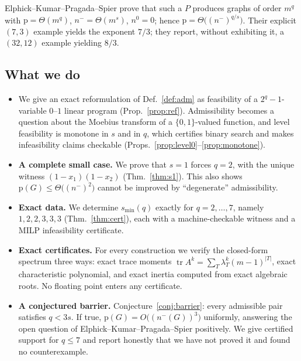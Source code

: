 \documentclass[11pt,a4paper]{article}
\theoremstyle{plain}
\theoremstyle{definition}
\newcommand{\pp}{\mathrm{p}}
\begin{document}
Elphick--Kumar--Pragada--Spier prove that such a $P$ produces graphs of order $m^q$ with
$\pp=\Theta(m^q)$, $n^-=\Theta(m^s)$, $n^0=0$; hence $\pp=\Theta\big((n^-)^{q/s}\big)$.
Their explicit $(7,3)$ example yields the exponent $7/3$; they report, without exhibiting
it, a $(32,12)$ example yielding $8/3$.

\subsection*{What we do}

\begin{itemize}
\item[\textbf{(A)}] We give an exact reformulation of \textup{Def.~\ref{def:adm}} as
      feasibility of a $2^q-1$-variable $0$--$1$ linear program
      (Prop.~\ref{prop:ref}).  Admissibility becomes a question about the Moebius
      transform of a $\{0,1\}$-valued function, and level feasibility is monotone in $s$
      and in $q$, which certifies binary search and makes infeasibility claims checkable
      (Props.~\ref{prop:level0}--\ref{prop:monotone}).
\item[\textbf{(B)}] \textbf{A complete small case.}  We prove that $s=1$ forces $q=2$,
      with the unique witness $(1-x_1)(1-x_2)$
      (Thm.~\ref{thm:s1}).  This also shows $\pp(G)\le \Theta\big((n^-)^{2}\big)$ cannot be
      improved by ``degenerate'' admissibility.
\item[\textbf{(C)}] \textbf{Exact data.}  We determine $s_{\min}(q)$ exactly for
      $q=2,\dots,7$, namely $1,2,2,3,3,3$ (Thm.~\ref{thm:cert}), each with a
      machine-checkable witness and a MILP infeasibility certificate.
\item[\textbf{(D)}] \textbf{Exact certificates.}  For every construction we verify the
      closed-form spectrum three ways: exact trace moments
      $\operatorname{tr}A^k=\sum_T\lambda_T^k(m-1)^{|T|}$, exact characteristic
      polynomial, and exact inertia computed from exact algebraic roots.  No floating
      point enters any certificate.
\item[\textbf{(E)}] \textbf{A conjectured barrier.}  Conjecture~\ref{conj:barrier}: every
      admissible pair satisfies $q<3s$.  If true, $\pp(G)=O\big((n^-(G))^{3}\big)$
      uniformly, answering the open question of Elphick--Kumar--Pragada--Spier positively.
      We give certified support for $q\le 7$ and report honestly that we have not proved
      it and found no counterexample.
\end{itemize}
\end{document}
